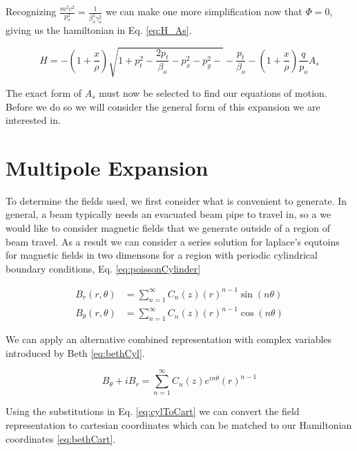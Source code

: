 Recognizing $\frac{m^2c^2}{p_o^2} = \frac{1}{\beta_o^2 \gamma_o^2}$ we can make one more simplification now that $\Phi = 0$, giving us the hamiltonian in Eq. \ref{eq:H_As}.

\begin{equation} \label{eq:H_As}
	H = -\left(1 + \frac{x}{\rho}\right)\sqrt{1 + p_t^2 - \frac{2 p_t}{\beta_o} - p_x^2 - p_y^2- } - \frac{p_t}{\beta_o} - \left(1 + \frac{x}{\rho}\right)\frac{q}{p_o}A_s
\end{equation}

The exact form of $A_s$ must now be selected to find our equations of motion. Before we do so we will consider the general form of this expansion we are interested in.

\section{Multipole Expansion} \label{sec:multipole}

To determine the fields used, we first consider what is convenient to generate. In general, a beam typically needs an evacuated beam pipe to travel in, so a we would like to consider magnetic fields that we generate outside of a region of beam travel. As a result we can consider a series solution for laplace's equtoins for magnetic fields in two dimensons for a region with periodic cylindrical boundary conditions, Eq. \ref{eq:poissonCylinder}

\begin{equation} \label{eq:poissonCylinder}
\begin{split}
	B_r(r,\theta) &= \sum_{n=1}^{\infty} C_n(z) \left( r \right)^{n-1} \sin{(n\theta)}\\
	B_\theta(r,\theta) &= \sum_{n=1}^{\infty} C_n(z) \left( r \right)^{n-1} \cos{(n\theta)}
\end{split}
\end{equation}

We can apply an alternative combined representation with complex variables introduced by Beth \cite{Beth} \ref{eq:bethCyl}.

\begin{equation} \label{eq:bethCyl}
	B_{\theta} + i B_r = \sum_{n=1}^{\infty} C_n(z) e^{in\theta} \left( r \right)^{n-1}
\end{equation}

Using the substitutions in Eq. \ref{eq:cylToCart} we can convert the field representation to cartesian coordinates which can be matched to our Hamiltonian coordinates \ref{eq:bethCart}.

